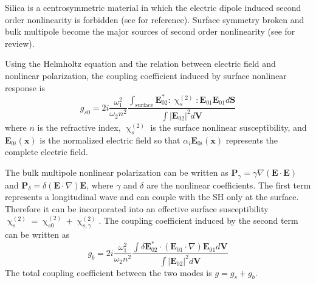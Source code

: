 \documentclass[a4paper,8pt,hyperref, twocolumn]{article}
\begin{document}
Silica is a centrosymmetric material in which the electric dipole induced second order nonlinearity is forbidden (see \cite{boyd2003nonlinear} for reference). Surface symmetry broken and bulk multipole become the major sources of second order nonlinearity (see \cite{heinz1991second} for review). 




Using the Helmholtz equation and the relation between electric field and nonlinear polarization, the coupling coefficient induced by surface nonlinear response is
\begin{equation}
g_{s0} = 2i\frac{\omega_1^2}{\omega_2n^2}\frac{\int_{\mathrm{surface} } \mathbf{E}_{02}^*:\upchi^{(2)}_s:\mathbf{E}_{01}\mathbf{E}_{01} d\mathbf{S}}{\int |\mathbf{E}_{02}|^2 d\mathbf{V}}
\end{equation}
where $n$ is the refractive index, $\upchi^{(2)}_s$ is the surface nonlinear susceptibility, and $\mathbf{E}_{0i}(\mathbf{x})$ is the  normalized electric field so that $\alpha_i\mathbf{E}_{0i}(\mathbf{x})$ represents the complete electric field. 

The bulk multipole nonlinear polarization can be written as $\mathbf{P}_\gamma =  \gamma\nabla(\mathbf{E}\cdot\mathbf{E})$ and $\mathbf{P}_\delta =  \delta(\mathbf{E}\cdot\nabla)\mathbf{E}$, where $\gamma$ and $\delta$ are the nonlinear coefficients. The first term represents a longitudinal wave and can couple with the SH only at the surface. Therefore it can be incorporated into an effective surface susceptibility $\upchi^{(2)}_s = \upchi^{(2)}_{s0}+\upchi^{(2)}_{s,\gamma}$\cite{heinz1991second}. The coupling coefficient induced by the second term can be written as %
\begin{equation}
g_b =  2i\frac{\omega_1^2}{\omega_2n^2}\frac{\int \delta\mathbf{E}_{02}^* \cdot (\mathbf{E}_{01}\cdot\nabla)\mathbf{E}_{01} d\mathbf{V}}{\int |\mathbf{E}_{02}|^2 d\mathbf{V}}
\label{eq:gb}
\end{equation}
The total coupling coefficient between the two modes is $g = g_s+g_b$. 
\end{document}
